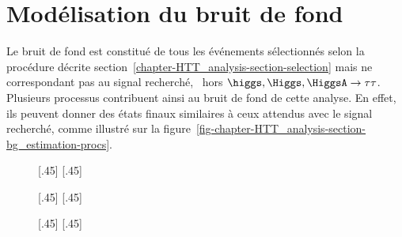 \section{Modélisation du bruit de fond}\label{chapter-HTT_analysis-section-bg_estimation}
Le bruit de fond est constitué de tous les événements sélectionnés selon la procédure décrite section~\ref{chapter-HTT_analysis-section-selection} mais ne correspondant pas au signal recherché, \ie\ hors $\higgs,\Higgs,\HiggsA\to\tau\tau$.
Plusieurs processus contribuent ainsi au bruit de fond de cette analyse.
En effet, ils peuvent donner des états finaux similaires à ceux attendus avec le signal recherché, comme illustré sur la figure~\ref{fig-chapter-HTT_analysis-section-bg_estimation-procs}.
\begin{figure}[h]
\centering

\vspace{\baselineskip}

[.45\textwidth]
{\vspace{\baselineskip}}
\hfill
{}[.45\textwidth]
{\vspace{\baselineskip}}

\vspace{2\baselineskip}

[.45\textwidth]
{\vspace{\baselineskip}}
\hfill
{}[.45\textwidth]
{\vspace{\baselineskip}}

\vspace{2\baselineskip}

[.45\textwidth]
{\vspace{\baselineskip}}
\hfill
{}[.45\textwidth]
{\vspace{\baselineskip}}


\end{figure}
